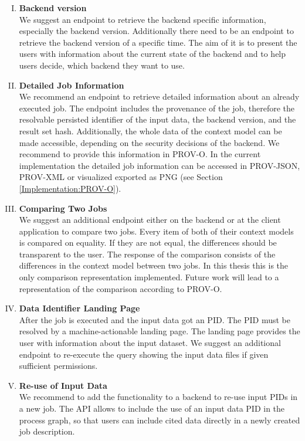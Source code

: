 \documentclass[draft,final]{vutinfth} %
\begin{document}
\begin{enumerate}[I.]
\item \textbf{Backend version} \\
	We suggest an endpoint to retrieve the backend specific information, especially the backend version. Additionally there need to be an endpoint to retrieve the backend version of a specific time. The aim of it is to present the users with information about the current state of the backend and to help users decide, which backend they want to use. 

\item \textbf{Detailed Job Information} \\
	We recommend an endpoint to retrieve detailed information about an already executed job. The endpoint includes the provenance of the job, therefore the resolvable persisted identifier of the input data, the backend version, and the result set hash. Additionally, the whole data of the context model can be made accessible, depending on the security decisions of the backend. {We recommend to provide this information in PROV-O. In the current implementation the detailed job information can be accessed in PROV-JSON, PROV-XML or visualized exported as PNG (see Section \ref{Implementation:PROV-O}).}   
\item \textbf{Comparing Two Jobs} \\
	We suggest an additional endpoint either on the backend or at the client application to compare two jobs. Every item of both of their context models is compared on equality. If they are not equal, the differences should be transparent to the user. The response of the comparison consists of the differences in the context model between two jobs. {In this thesis this is the only comparison representation implemented. Future work will lead to a representation of the comparison according to PROV-O.}
\newpage
\item \textbf{Data Identifier Landing Page} \\
	After the job is executed and the input data got an PID. The PID must be resolved by a {machine-actionable} landing page. The landing page provides the user with information about the input dataset. We suggest an additional endpoint to re-execute the query showing the input data files if given sufficient permissions.
    
\item \textbf{Re-use of Input Data} \\
	We recommend to add the functionality to a backend to re-use input PIDs in a new job. The API allows to include the use of an input data PID in the process graph, so that users can include cited data directly in a newly created job description.   
\end{enumerate}
\end{document}
